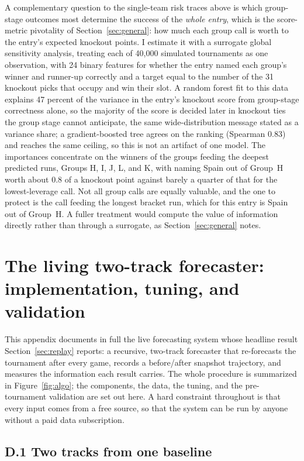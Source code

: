\documentclass[11pt,letterpaper]{article}
\begin{document}
A complementary question to the single-team risk traces above is which group-stage outcomes most determine the success of the \emph{whole entry}, which is the score-metric pivotality of Section~\ref{sec:general}: how much each group call is worth to the entry's expected knockout points. I estimate it with a surrogate global sensitivity analysis, treating each of 40{,}000 simulated tournaments as one observation, with 24 binary features for whether the entry named each group's winner and runner-up correctly and a target equal to the number of the 31 knockout picks that occupy and win their slot. A random forest fit to this data explains 47 percent of the variance in the entry's knockout score from group-stage correctness alone, so the majority of the score is decided later in knockout ties the group stage cannot anticipate, the same wide-distribution message stated as a variance share; a gradient-boosted tree agrees on the ranking (Spearman 0.83) and reaches the same ceiling, so this is not an artifact of one model. The importances concentrate on the winners of the groups feeding the deepest predicted runs, Groups H, I, J, L, and K, with naming Spain out of Group~H worth about 0.8 of a knockout point against barely a quarter of that for the lowest-leverage call. Not all group calls are equally valuable, and the one to protect is the call feeding the longest bracket run, which for this entry is Spain out of Group~H. A fuller treatment would compute the value of information directly rather than through a surrogate, as Section~\ref{sec:general} notes.

\section{The living two-track forecaster: implementation, tuning, and validation}\label{app:prophet}

This appendix documents in full the live forecasting system whose headline result Section~\ref{sec:replay} reports: a recursive, two-track forecaster that re-forecasts the tournament after every game, records a before/after snapshot trajectory, and measures the information each result carries. The whole procedure is summarized in Figure~\ref{fig:algo}; the components, the data, the tuning, and the pre-tournament validation are set out here. A hard constraint throughout is that every input comes from a free source, so that the system can be run by anyone without a paid data subscription.

\subsection*{D.1 \quad Two tracks from one baseline}
\end{document}
